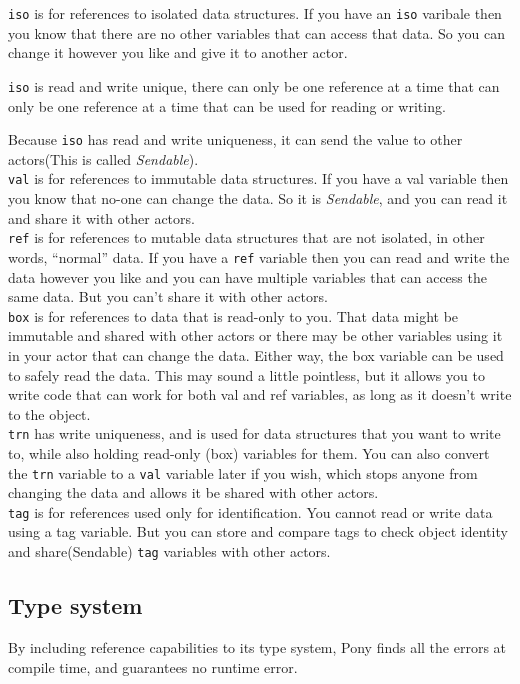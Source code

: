 \documentclass{article}
\begin{document}
\begin{multicols}{2}
\texttt{iso} is for references to isolated data structures. If you have an \texttt{iso} varibale then you know that there are no other variables that can access that data. So you can change it however you like and give it to another actor. 

\texttt{iso} is read and write unique, there can only be one reference at a time that can only be one reference at a time that can be used for reading or writing.

Because \texttt{iso} has read and write uniqueness, it can send the value to other actors(This is called \textit{Sendable}).\\

\texttt{val} is for references to immutable data structures. If you have a val variable then you know that no-one can change the data. So it is \textit{Sendable}, and you can read it and share it with other actors.\\


\texttt{ref}  is for references to mutable data structures that are not isolated, in other words, “normal” data. If you have a \texttt{ref} variable then you can read and write the data however you like and you can have multiple variables that can access the same data. But you can’t share it with other actors.\\

\texttt{box} is for references to data that is read-only to you. That data might be immutable and shared with other actors or there may be other variables using it in your actor that can change the data. Either way, the box variable can be used to safely read the data. This may sound a little pointless, but it allows you to write code that can work for both val and ref variables, as long as it doesn’t write to the object.\\

\texttt{trn} has write uniqueness, and is used for data structures that you want to write to, while also holding read-only (box) variables for them. You can also convert the \texttt{trn} variable to a \texttt{val} variable later if you wish, which stops anyone from changing the data and allows it be shared with other actors. \\

\texttt{tag} is for references used only for identification. You cannot read or write data using a tag variable. But you can store and compare tags to check object identity and share(Sendable) \texttt{tag} variables with other actors.

\subsection{Type system}
By including reference capabilities to its type system, Pony finds all the errors at compile time, and guarantees no runtime error.


\end{multicols}
\end{document}

